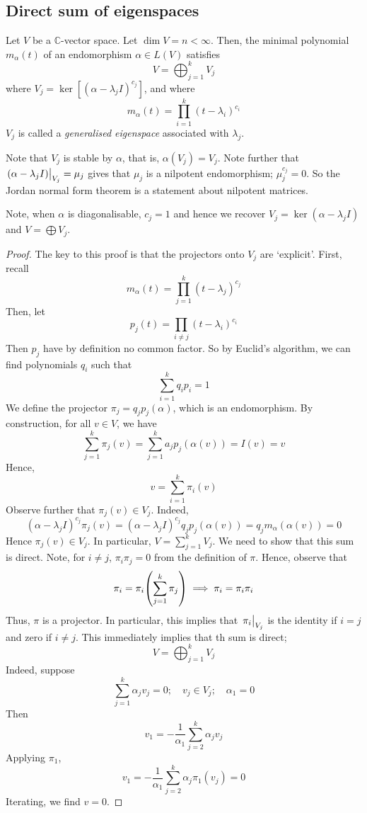 \subsection{Direct sum of eigenspaces}
\begin{theorem}
	Let \( V \) be a \( \mathbb C \)-vector space.
	Let \( \dim V = n < \infty \).
	Then, the minimal polynomial \( m_\alpha(t) \) of an endomorphism \( \alpha \in L(V) \) satisfies
	\[
		V = \bigoplus_{j=1}^k V_j
	\]
	where \( V_j = \ker[(\alpha - \lambda_j I)^{c_j}] \), and where
	\[
		m_\alpha(t) = \prod_{i=1}^k (t - \lambda_i)^{c_i}
	\]
	\( V_j \) is called a \textit{generalised eigenspace} associated with \( \lambda_j \).
\end{theorem}
\begin{remark}
	Note that \( V_j \) is stable by \( \alpha \), that is, \( \alpha(V_j) = V_j \).
	Note further that \( \eval{(\alpha - \lambda_j I)}_{V_j} = \mu_j \) gives that \( \mu_j \) is a nilpotent endomorphism; \( \mu_j^{c_j} = 0 \).
	So the Jordan normal form theorem is a statement about nilpotent matrices.

	Note, when \( \alpha \) is diagonalisable, \( c_j = 1 \) and hence we recover \( V_j = \ker(\alpha - \lambda_j I) \) and \( V = \bigoplus V_j \).
\end{remark}
\begin{proof}
	The key to this proof is that the projectors onto \( V_j \) are `explicit'.
	First, recall
	\[
		m_\alpha(t) = \prod_{j=1}^k (t-\lambda_j)^{c_j}
	\]
	Then, let
	\[
		p_j(t) = \prod_{i \neq j} (t - \lambda_i)^{c_i}
	\]
	Then \( p_j \) have by definition no common factor.
	So by Euclid's algorithm, we can find polynomials \( q_i \) such that
	\[
		\sum_{i=1}^k q_i p_i = 1
	\]
	We define the projector \( \pi_j = q_j p_j(\alpha) \), which is an endomorphism.
	By construction, for all \( v \in V \), we have
	\[
		\sum_{j=1}^k \pi_j(v) = \sum_{j=1}^k a_j p_j(\alpha(v)) = I(v) = v
	\]
	Hence,
	\[
		v = \sum_{i=1}^k \pi_i(v)
	\]
	Observe further that \( \pi_j(v) \in V_j \).
	Indeed,
	\[
		(\alpha - \lambda_j I)^{c_j} \pi_j(v) = (\alpha - \lambda_j I)^{c_j} q_j p_j(\alpha(v)) = q_j m_\alpha (\alpha(v)) = 0
	\]
	Hence \( \pi_j(v) \in V_j \).
	In particular, \( V = \sum_{j=1}^k V_j \).
	We need to show that this sum is direct.
	Note, for \( i \neq j \), \( \pi_i \pi_j = 0 \) from the definition of \( \pi \).
	Hence, observe that
	\[
		\pi_i = \pi_i \qty(\sum_{j=1}^k \pi_j) \implies \pi_i = \pi_i \pi_i
	\]
	Thus, \( \pi \) is a projector.
	In particular, this implies that \( \eval{\pi_i}_{V_j} \) is the identity if \( i = j \) and zero if \( i \neq j \).
	This immediately implies that th sum is direct;
	\[
		V = \bigoplus_{j=1}^k V_j
	\]
	Indeed, suppose
	\[
		\sum_{j=1}^k \alpha_j v_j = 0;\quad v_j \in V_j;\quad \alpha_1 = 0
	\]
	Then
	\[
		v_1 = -\frac{1}{\alpha_1} \sum_{j=2}^k \alpha_j v_j
	\]
	Applying \( \pi_1 \),
	\[
		v_1 = -\frac{1}{\alpha_1} \sum_{j=2}^k \alpha_j \pi_1(v_j) = 0
	\]
	Iterating, we find \( v = 0 \).
\end{proof}
